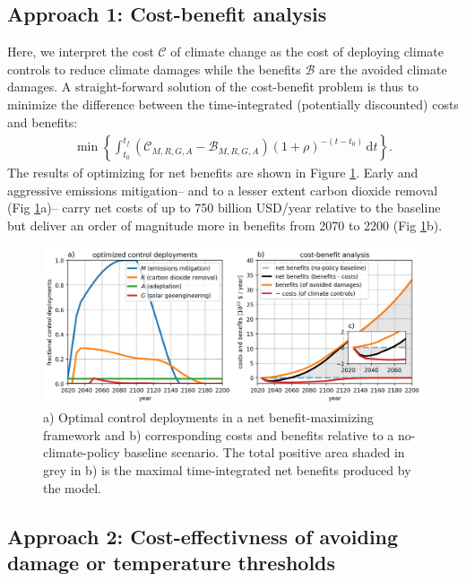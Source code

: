 \documentclass{article}
\begin{document}
\subsection{Approach 1: Cost-benefit analysis}\label{sec.cost_benefit}

Here, we interpret the cost $\mathcal{C}$ of climate change as the cost of deploying climate controls to reduce climate damages while the benefits $\mathcal{B}$ are the avoided climate damages. A straight-forward solution of the cost-benefit problem is thus to minimize the difference between the time-integrated (potentially discounted) costs and benefits:
\begin{gather}
    \min \left\{ \int_{t_{0}}^{t_{f}} 
    \left(\mathcal{C}_{M, R, G, A} - \mathcal{B}_{M, R, G, A}\right) (1 + \rho)^{-(t-t_{0})} \, \text{d}t \right\}.
\end{gather}
The results of optimizing for net benefits are shown in Figure \ref{fig.approach1}. Early and aggressive emissions mitigation– and to a lesser extent carbon dioxide removal (Fig \ref{fig.approach1}a)– carry net costs of up to 750 billion USD/year relative to the baseline but deliver an order of magnitude more in benefits from 2070 to 2200 (Fig \ref{fig.approach1}b).

\begin{figure}[htb!]
\noindent\includegraphics[width=1.0\textwidth]{figures/default-benefits_controls_and_benefits.png}
\centering
\caption{a) Optimal control deployments in a net benefit-maximizing framework and b) corresponding costs and benefits relative to a no-climate-policy baseline scenario. The total positive area shaded in grey in b) is the maximal time-integrated net benefits produced by the model.}
\label{fig.approach1}
\end{figure}

\subsection{Approach 2: Cost-effectivness of avoiding damage or temperature thresholds}\label{sec.cost-effectivness}
\end{document}
